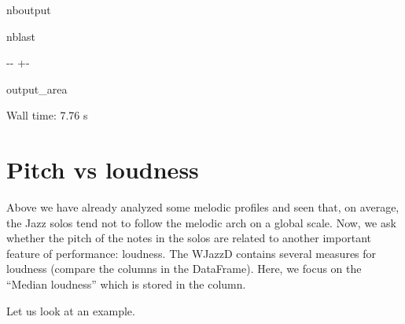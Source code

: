 \documentclass[letterpaper,10pt,english]{sphinxmanual}
\newlength\nbsphinxcodecellspacing
\begin{document}
\begin{sphinxuseclass}{nboutput}
\begin{sphinxuseclass}{nblast}
{

\kern-\sphinxverbatimsmallskipamount\kern-\baselineskip
\kern+\FrameHeightAdjust\kern-\fboxrule
\vspace{\nbsphinxcodecellspacing}

\begin{sphinxuseclass}{output_area}
\begin{sphinxuseclass}{}


\begin{sphinxVerbatim}[commandchars=\\\{\}]
Wall time: 7.76 s
\end{sphinxVerbatim}



\end{sphinxuseclass}
\end{sphinxuseclass}
}

\end{sphinxuseclass}
\end{sphinxuseclass}

\section{Pitch vs loudness}
\label{\detokenize{04_jazz_solos:Pitch-vs-loudness}}
\sphinxAtStartPar
Above we have already analyzed some melodic profiles and seen that, on average, the Jazz solos tend not to follow the melodic arch on a global scale. Now, we ask whether the pitch of the notes in the solos are related to another important feature of performance: loudness. The WJazzD contains several measures for loudness (compare the columns in the  DataFrame). Here, we focus on the “Median loudness” which is stored in the  column.

\sphinxAtStartPar
Let us look at an example.
\end{document}
